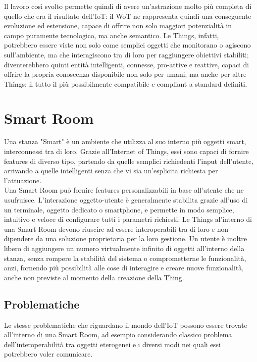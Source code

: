 \documentclass[12pt,a4paper,openright,oneside]{report}
\begin{document}
Il lavoro così svolto permette quindi di avere un'astrazione molto più completa di quello che era il risultato dell'IoT: il WoT ne rappresenta quindi una conseguente evoluzione ed estensione, capace di offrire non solo maggiori potenzialità in campo puramente tecnologico, ma anche semantico. Le Things, infatti, potrebbero essere viste non solo come semplici oggetti che monitorano o agiscono sull'ambiente, ma che interagiscono tra di loro per raggiungere obiettivi stabiliti; diventerebbero quinti entità intelligenti, connesse, pro-attive e reattive, capaci di offrire la propria conoscenza disponibile non solo per umani, ma anche per altre Things: il tutto il più possibilmente compatibile e compliant a standard definiti.

\section{Smart Room}
Una stanza "Smart" \cite{smartroom} è un ambiente che utilizza al suo interno più oggetti smart, interconnessi tra di loro. Grazie all'Internet of Things, essi sono capaci di fornire features di diverso tipo, partendo da quelle semplici richiedenti l'input dell'utente, arrivando a quelle intelligenti senza che vi sia un'esplicita richiesta per l'attuazione.\\

Una Smart Room può fornire features personalizzabili in base all'utente che ne usufruisce. L'interazione oggetto-utente è generalmente stabilita grazie all'uso di un terminale, oggetto dedicato o smartphone, e permette in modo semplice, intuitivo e veloce di configurare tutti i parametri richiesti. Le Things al'interno di una Smart Room devono riuscire ad essere interoperabili tra di loro e non dipendere da una soluzione proprietaria per la loro gestione. Un utente è inoltre libero di aggiungere un numero virtualmente infinito di oggetti all'interno della stanza, senza rompere la stabilità del sistema o comprometterne le funzionalità, anzi, fornendo più possibilità alle cose di interagire e creare nuove funzionalità, anche non previste al momento della creazione della Thing.

\subsection{Problematiche}
Le stesse problematiche che riguardano il mondo dell'IoT possono essere trovate all'interno di una Smart Room, ad esempio considerando classico problema dell'interoperabilità tra oggetti eterogenei e i diversi modi nei quali essi potrebbero voler comunicare.\\
\end{document}
